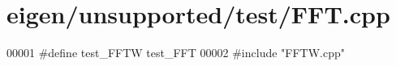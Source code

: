 \hypertarget{eigen_2unsupported_2test_2_f_f_t_8cpp_source}{}\section{eigen/unsupported/test/\+F\+FT.cpp}
\label{eigen_2unsupported_2test_2_f_f_t_8cpp_source}

\begin{DoxyCode}
00001 \textcolor{preprocessor}{#define test\_FFTW test\_FFT}
00002 \textcolor{preprocessor}{#include "FFTW.cpp"}
\end{DoxyCode}
